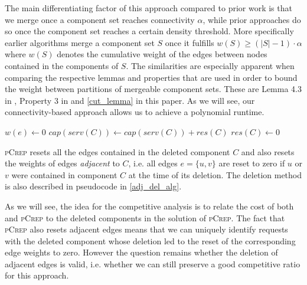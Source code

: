 \documentclass[a4paper,UKenglish,cleveref, autoref, thm-restate,authorcolumns]{lipics-v2019}
\newcommand{\adjDel}{\textsc{pCrep}}
\newcommand{\opt}{\text{O{\scriptsize PT}}}
\begin{document}
 The main differentiating factor of this approach compared
to prior work \cite{Avin2015,Avin2016} is that we merge once a 
component set reaches connectivity $\alpha$, while prior approaches do so once the component set reaches a certain density threshold. More specifically earlier algorithms
 merge a component set $S$ once it fulfills $w(S)\geq(|S|-1)\cdot\alpha$ where $w(S)$ denotes the cumulative weight of the edges between nodes contained in the components of $S$.
The similarities are especially apparent when comparing the respective lemmas and properties that are used in order to bound the weight between partitions of mergeable component sets. These are Lemma 4.3 in \cite{Avin2015}, Property 3 in \cite{Avin2016} and \cref{cut_lemma} in this paper.
As we will see, our connectivity-based approach 
allows us to achieve a polynomial runtime.


\begin{algorithm}
	\caption{delete($Y$) of \adjDel{}}
	\label{adj_del_alg}
	\begin{algorithmic}
		\STATE $w(e)\gets0$
		\ENDIF
		\ENDFOR
		\STATE $cap(serv(C))\gets cap(serv(C)) +res(C)$
		\STATE $res(C)\gets 0$			
		\ENDFOR
	\end{algorithmic}
\end{algorithm}

\adjDel{} resets all the edges contained in the deleted component $C$ and also resets the weights of edges \textit{adjacent} to $C$, i.e. all edges $e=\{u,v\}$ are reset to zero if $u$ or $v$ were contained in component $C$ at the time of its deletion. The deletion method is also described in pseudocode in \cref{adj_del_alg}.

As we will see, the idea for the competitive analysis is to relate the cost of both \opt{} and \adjDel{} to the deleted components in the solution of \adjDel{}.
The fact that \adjDel{} also resets adjacent edges means that we can uniquely identify requests with the deleted component whose deletion led to the reset of the corresponding edge weights to zero. 
However the question remains whether the deletion of adjacent edges is valid, i.e. whether we can still preserve a good competitive ratio for this approach.
\end{document}
